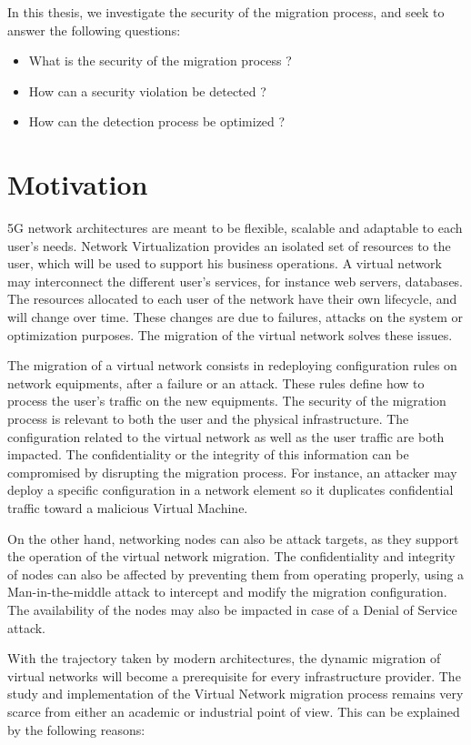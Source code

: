 In this thesis, we investigate the security of the migration process, and seek to answer the following questions:

\begin{itemize}
    \item What is the security of the migration process ?
    \item How can a security violation be detected ?
    \item How can the detection process be optimized ?
\end{itemize}

\section{Motivation}
5G network architectures are meant to be flexible, scalable and adaptable to each user's needs.
Network Virtualization provides an isolated set of resources to the user, which will be used to support his business operations. A virtual network may interconnect the different user's services, for instance web servers, databases. 
The resources allocated to each user of the network have their own lifecycle, and will change over time.
These changes are due to failures, attacks on the system or optimization purposes.
The migration of the virtual network solves these issues.

The migration of a virtual network consists in redeploying configuration rules on network equipments, after a failure or an attack. These rules define how to process the user's traffic on the new equipments.
The security of the migration process is relevant to both the user and the physical infrastructure.
The configuration related to the virtual network as well as the user traffic are both impacted. 
The confidentiality or the integrity of this information can be compromised by disrupting the migration process. For instance,  an attacker may deploy a specific configuration in a network element so it duplicates confidential traffic toward a malicious Virtual Machine.

On the other hand, networking nodes can also be attack targets, as they support the operation of the virtual network migration.
The confidentiality and integrity of nodes can also be affected by preventing them from operating properly, \eg using a Man-in-the-middle attack to intercept and modify the migration configuration. The availability of the nodes may also be impacted in case of a Denial of Service attack.

With the trajectory taken by modern architectures, the dynamic migration of virtual networks will become a prerequisite for every infrastructure provider.
The study and implementation of the Virtual Network migration process remains very scarce from either an academic or industrial point of view. This can be explained by the following reasons:

